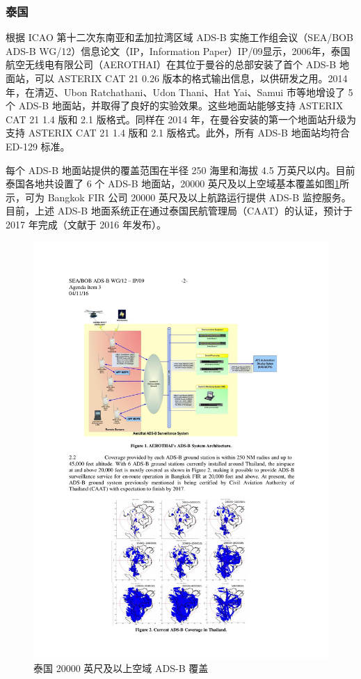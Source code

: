 
\subsubsection{泰国}

根据 ICAO 第十二次东南亚和孟加拉湾区域 ADS-B 实施工作组会议（SEA/BOB ADS-B WG/12）信息论文（IP，Information Paper）IP/09显示，2006年，泰国航空无线电有限公司（AEROTHAI）在其位于曼谷的总部安装了首个 ADS-B 地面站，可以 ASTERIX CAT 21 0.26 版本的格式输出信息，以供研发之用。2014 年，在清迈、Ubon Ratchathani、Udon Thani、Hat Yai、Samui 市等地增设了 5 个 ADS-B 地面站，并取得了良好的实验效果。这些地面站能够支持 ASTERIX CAT 21 1.4 版和 2.1 版格式。同样在 2014 年，在曼谷安装的第一个地面站升级为支持 ASTERIX CAT 21 1.4 版和 2.1 版格式。此外，所有 ADS-B 地面站均符合 ED-129 标准。

每个 ADS-B 地面站提供的覆盖范围在半径 250 海里和海拔 4.5 万英尺以内。目前泰国各地共设置了 6 个 ADS-B 地面站，20000 英尺及以上空域基本覆盖如图\ref{fig:thailand}所示，可为 Bangkok FIR 公司 20000 英尺及以上航路运行提供 ADS-B 监控服务。目前，上述 ADS-B 地面系统正在通过泰国民航管理局（CAAT）的认证，预计于 2017 年完成（文献于 2016 年发布）。

\begin{figure}[!htb]
\centering
\includegraphics[width=14cm]{pic/thailand.pdf}
\caption{泰国 20000 英尺及以上空域 ADS-B 覆盖\protect\footnotemark}
\label{fig:thailand}
\end{figure}

